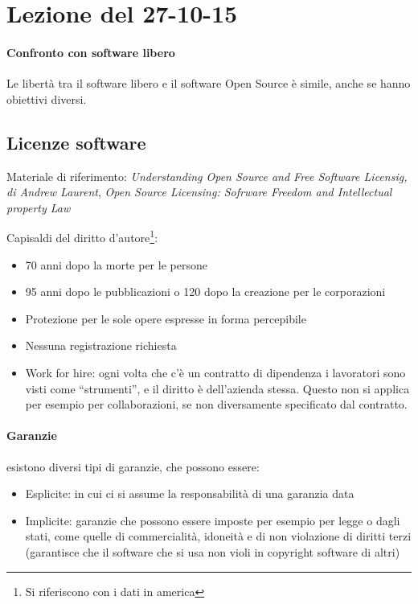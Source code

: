 \section{Lezione del 27-10-15}
\graphicspath{ {res/data/27-10-15/} }

\paragraph*{Confronto con software libero} Le libert\`a tra il software libero e il software Open Source \`e simile, anche se hanno obiettivi diversi.

\subsection{Licenze software}

Materiale di riferimento: \textit{Understanding Open Source and Free Software Licensig, di Andrew Laurent}, \textit{Open Source Licensing: Sofrware Freedom and Intellectual property Law}

Capisaldi del diritto d'autore\footnote{Si riferiscono con i dati in america}:
\begin{itemize}
\item 70 anni dopo la morte per le persone
\item 95 anni dopo le pubblicazioni o 120 dopo la creazione per le corporazioni
\item Protezione per le sole opere espresse in forma percepibile
\item Nessuna registrazione richiesta
\item Work for hire: ogni volta che c'\`e un contratto di dipendenza i lavoratori sono visti come ``strumenti'', e il diritto \`e dell'azienda stessa. Questo non si applica per esempio per collaborazioni, se non diversamente specificato dal contratto.
\end{itemize}

\paragraph*{Garanzie} esistono diversi tipi di garanzie, che possono essere:
\begin{itemize}
\item Esplicite: in cui ci si assume la responsabilit\`a di una garanzia data
\item Implicite: garanzie che possono essere imposte per esempio per legge o dagli stati, come quelle di commercialit\`a, idoneit\`a e di non violazione di diritti terzi (garantisce che il software che si usa non violi in copyright software di altri)
\end{itemize}

